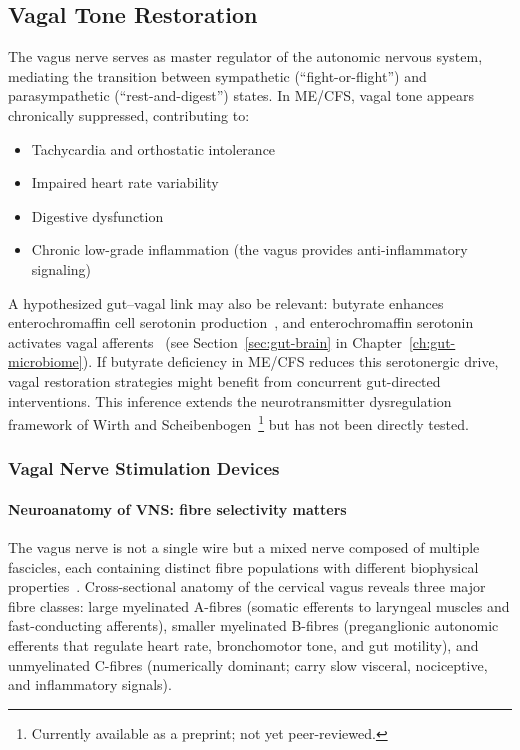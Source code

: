 \subsection{Vagal Tone Restoration}

The vagus nerve serves as master regulator of the autonomic nervous system, mediating the transition between sympathetic (``fight-or-flight'') and parasympathetic (``rest-and-digest'') states. In ME/CFS, vagal tone appears chronically suppressed, contributing to:
\begin{itemize}
    \item Tachycardia and orthostatic intolerance
    \item Impaired heart rate variability
    \item Digestive dysfunction
    \item Chronic low-grade inflammation (the vagus provides anti-inflammatory signaling)
\end{itemize}

A hypothesized gut--vagal link may also be relevant: butyrate enhances enterochromaffin cell serotonin production~\cite{Barton2025}, and enterochromaffin serotonin activates vagal afferents~\cite{Barton2023,Kaelberer2018} (see Section~\ref{sec:gut-brain} in Chapter~\ref{ch:gut-microbiome}). If butyrate deficiency in ME/CFS reduces this serotonergic drive, vagal restoration strategies might benefit from concurrent gut-directed interventions. This inference extends the neurotransmitter dysregulation framework of Wirth and Scheibenbogen~\cite{WirthScheibenbogen2025Neurotransmitter}\footnote{Currently available as a preprint; not yet peer-reviewed.} but has not been directly tested.

\subsubsection{Vagal Nerve Stimulation Devices}

\paragraph{Neuroanatomy of VNS: fibre selectivity matters}

The vagus nerve is not a single wire but a mixed nerve composed of multiple fascicles, each containing distinct fibre populations with different biophysical properties~\cite{Bu2026VNSReview}. Cross-sectional anatomy of the cervical vagus reveals three major fibre classes: large myelinated A-fibres (somatic efferents to laryngeal muscles and fast-conducting afferents), smaller myelinated B-fibres (preganglionic autonomic efferents that regulate heart rate, bronchomotor tone, and gut motility), and unmyelinated C-fibres (numerically dominant; carry slow visceral, nociceptive, and inflammatory signals).


